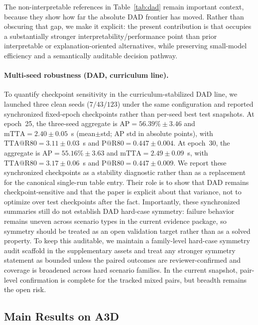 The non-interpretable references in Table~\ref{tab:dad} remain important
context, because they show how far the absolute DAD frontier has moved. Rather
than obscuring that gap, we make it explicit: the present contribution is that
\method{} occupies a substantially stronger interpretability/performance point
than prior interpretable or explanation-oriented alternatives, while preserving
small-model efficiency and a semantically auditable decision pathway.

\paragraph{Multi-seed robustness (DAD, curriculum line).}
To quantify checkpoint sensitivity in the curriculum-stabilized DAD line, we
launched three clean seeds ($7/43/123$) under the same configuration and
reported synchronized fixed-epoch checkpoints rather than per-seed best test
snapshots. At epoch~25, the three-seed aggregate is
$\text{AP}=56.39\%\pm3.46$ and $\text{mTTA}=2.40\pm0.05$~s
(mean$\pm$std; AP std in absolute points), with
$\text{TTA@R80}=3.11\pm0.03$~s and $\text{P@R80}=0.447\pm0.004$.
At epoch~30, the aggregate is
$\text{AP}=55.16\%\pm3.63$ and $\text{mTTA}=2.49\pm0.09$~s,
with $\text{TTA@R80}=3.17\pm0.06$~s and $\text{P@R80}=0.447\pm0.009$.
We report these synchronized checkpoints as a stability diagnostic rather than
as a replacement for the canonical single-run table entry. Their role is to
show that DAD remains checkpoint-sensitive and that the paper is explicit about
that variance, not to optimize over test checkpoints after the fact.
Importantly, these synchronized summaries still do not establish DAD hard-case
symmetry: failure behavior remains uneven across scenario types in the current
evidence package, so symmetry should be treated as an open validation target
rather than as a solved property.
To keep this auditable, we maintain a family-level hard-case symmetry audit
scaffold in the supplementary assets and treat any stronger symmetry statement
as bounded unless the paired outcomes are reviewer-confirmed and coverage is
broadened across hard scenario families. In the current snapshot, pair-level
confirmation is complete for the tracked mixed pairs, but breadth remains the
open risk.

\subsection{Main Results on A3D}


